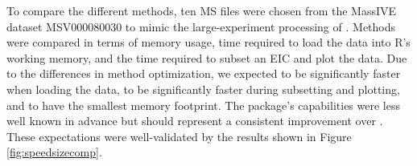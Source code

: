 To compare the different methods, ten MS files were chosen from the MassIVE dataset \newline MSV000080030 to mimic the large-experiment processing of \citet{gatto2015}. Methods were compared in terms of memory usage, time required to load the data into R's working memory, and the time required to subset an EIC and plot the data. Due to the differences in method optimization, we expected  to be significantly faster when loading the data,  to be significantly faster during subsetting and plotting, and  to have the smallest memory footprint. The  package's capabilities were less well known in advance but should represent a consistent improvement over . These expectations were well-validated by the results shown in Figure \ref{fig:speedsizecomp}.

